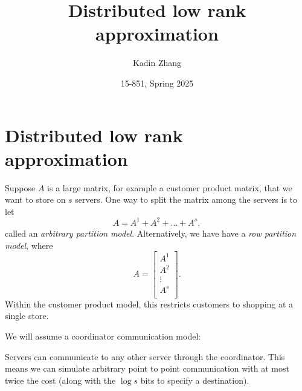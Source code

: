 \documentclass{article}
\title{Distributed low rank approximation}
\author{Kadin Zhang}
\date{15-851, Spring 2025}
\begin{document}
\maketitle
{
\small
\setlength{\parindent}{0em}
\setlength{\parskip}{1em}
}

\section{Distributed low rank approximation}

Suppose $A$ is a large matrix, for example a customer product matrix, that we want to store on $s$ servers. One way to split the matrix among the servers is to let 
\[
    A = A^1 +A^2 +\dots +A^s ,
\]
called an \emph{arbitrary partition model}. Alternatively, we have have a \emph{row partition model}, where 
\[
    A = \begin{bmatrix}
         A^1  \\
         A^2  \\
         \vdots \\
         A^s  \\
    \end{bmatrix}.
\]
Within the customer product model, this restricts customers to shopping at a single store. 

We will assume a coordinator communication model:
\begin{center}
\end{center}
Servers can communicate to any other server through the coordinator. This means we can simulate arbitrary point to point communication with at most twice the cost (along with the $\log s$ bits to specify a destination). 
\end{document}
